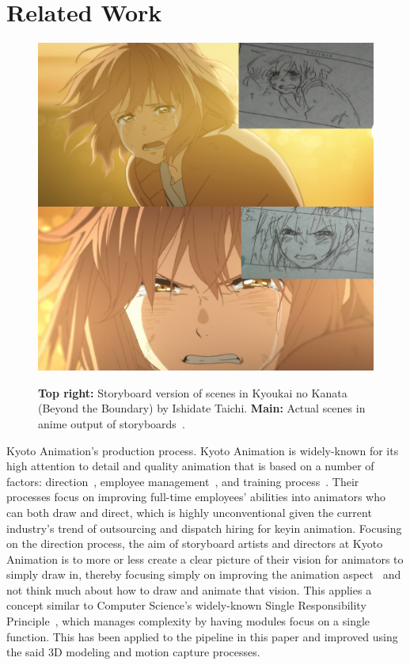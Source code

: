 \section{Related Work}

\begin{figure}[t]
    \centering
    \includegraphics[width=1\linewidth]{img/relatedwork/kyoukai_ishidate.pdf} \\
    \caption{\textbf{Top right:} Storyboard version of scenes in Kyoukai no Kanata (Beyond the Boundary) by Ishidate Taichi. \textbf{Main:} Actual scenes in anime output of storyboards~\cite{kyoAniDirectionTaichi}.}
    \vspace{-15pt}
    \label{fig:kyoukai_ishidate}
\end{figure}

Kyoto Animation's production process. Kyoto Animation is widely-known for its high attention to detail and quality animation that is based on a number of factors: direction~\cite{kyoAniDirectionTaichi, kyoAniDirectionFujita, kyoAniDirectionYamada}, employee management~\cite{kyoAniEmployeeMgmt, kyoAniCulture}, and training process~\cite{kyoAniTour, kyoAniSchool}. Their processes focus on improving full-time employees' abilities into animators who can both draw and direct, which is highly unconventional given the current industry's trend of outsourcing and dispatch hiring for keyin animation. Focusing on the direction process, the aim of storyboard artists and directors at Kyoto Animation is to more or less create a clear picture of their vision for animators to simply draw in, thereby focusing simply on improving the animation aspect~\cite{principlesOfAnimation} and not think much about how to draw and animate that vision. This applies a concept similar to Computer Science's widely-known Single Responsibility Principle~\cite{singleResponsibilityPrinciple}, which manages complexity by having modules focus on a single function. This has been applied to the pipeline in this paper and improved using the said 3D modeling and motion capture processes.\\\\

